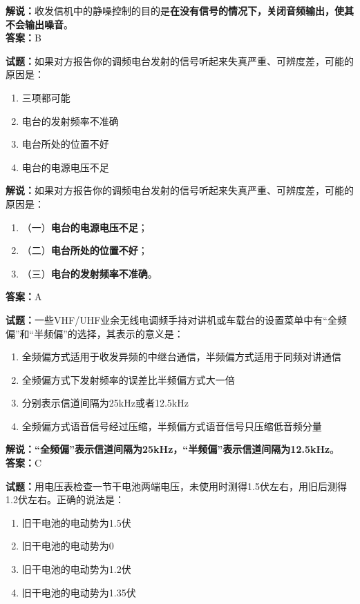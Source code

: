 \documentclass{ctexbook}
\begin{document}
\noindent\textbf{解说：}收发信机中的静噪控制的目的是\textbf{在没有信号的情况下，关闭音频输出，使其不会输出噪音}。\\\noindent\textbf{答案：}B%
\bigskip


\noindent\textbf{试题：}如果对方报告你的调频电台发射的信号听起来失真严重、可辨度差，可能的原因是：

\begin{enumerate}[leftmargin=3em]
	\item 三项都可能
	\item 电台的发射频率不准确
	\item 电台所处的位置不好
	\item 电台的电源电压不足
\end{enumerate}

\noindent\textbf{解说：}如果对方报告你的调频电台发射的信号听起来失真严重、可辨度差，可能的原因是：
\begin{enumerate}[label=, leftmargin=0.8em]
	\item （一）\textbf{电台的电源电压不足}；
	\item （二）\textbf{电台所处的位置不好}；
	\item （三）\textbf{电台的发射频率不准确}。
\end{enumerate}
\noindent\textbf{答案：}A

\bigskip


\noindent\textbf{试题：}一些VHF/UHF业余无线电调频手持对讲机或车载台的设置菜单中有“全频偏”和“半频偏”的选择，其表示的意义是：

\begin{enumerate}[leftmargin=3em]
	\item 全频偏方式适用于收发异频的中继台通信，半频偏方式适用于同频对讲通信
	\item 全频偏方式下发射频率的误差比半频偏方式大一倍
	\item 分别表示信道间隔为25kHz或者12.5kHz
	\item 全频偏方式语音信号经过压缩，半频偏方式语音信号只压缩低音频分量
\end{enumerate}

\noindent\textbf{解说：}\textbf{“全频偏”表示信道间隔为25kHz，“半频偏”表示信道间隔为12.5kHz}。\\\noindent\textbf{答案：}C

\bigskip


\noindent\textbf{试题：}用电压表检查一节干电池两端电压，未使用时测得1.5伏左右，用旧后测得1.2伏左右。正确的说法是：

\begin{enumerate}[leftmargin=3em]
	\item 旧干电池的电动势为1.5伏
	\item 旧干电池的电动势为0
	\item 旧干电池的电动势为1.2伏
	\item 旧干电池的电动势为1.35伏
\end{enumerate}
\end{document}
